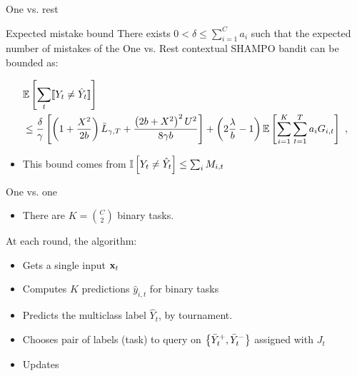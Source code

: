 \documentclass{beamer}
\begin{document}
\begin{frame}{One vs. rest}
\begin{block}{Expected mistake bound}
There exists $0<\delta\le \sum_{i=1}^Ca_{i}$ such that the  expected number of mistakes  of the One vs. Rest contextual SHAMPO bandit  can be bounded as:

 \[
 \begin{split}
 &\mathbb{E}\left[{\sum_t [\![{Y_t \neq \hat{Y}_t}]\!]}\right]\\
 &\le \frac{\delta}{\gamma}\left[{\left(1+\frac{X^2}{2b} \right){\bar L}_{\gamma,T}+
 \frac{\left({2b+X^2}\right)^2U^2}{8{\gamma}b}}\right]
 +\left({2\frac{\lambda}{b}-1}\right)\mathbb{E}\left[{\sum_{i=1}^{K}\sum_{t=1}^{T}{a_{i}G_{i,t}}}\right]~,
 \end{split}
 \]
\end{block}

\begin{itemize}
\item This bound comes from $\mathbb{I}\left[{Y_t \neq \hat{Y}_t}\right]\le \sum_iM_{i,t}$\newline

\end{itemize}
\end{frame}


\begin{frame}{One vs. one}
\begin{itemize}

\item There are $K= {C\choose2}$ binary tasks.\newline

\end{itemize}
At each round, the algorithm:\newline
\begin{itemize}
\item Gets a single input $\mathbf{x}_{t}$\newline
\item Computes $K$ predictions  $\hat{y}_{i,t}$ for binary tasks\newline
\item Predicts the multiclass label $\hat{Y}_t$, by tournament. \newline
\item Chooses pair of labels  (task) to  query on $\left\{{\bar{Y}_t^{+},\bar{Y}_t^{-}}\right\}$ assigned with $J_t$ \newline
\item Updates%
\end{itemize}
\end{frame}
\end{document}
